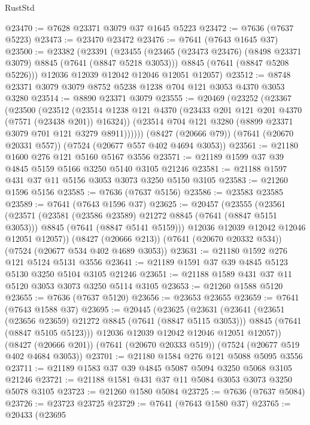 \begin{lexlean}{RustStd}
\begin{coremodule}
{\begin{coremodule}
{{{{{{{{{{{{{{{{{{{{{{{{{{{{{{{{@23470 := @7628 @23371 @3079 @37 @1645 @5223
@23472 := @7636 (@7637 @5223)
@23473 := @23470 @23472
@23476 := @7641 (@7643 @1645 @37)
@23500 := @23382
    (@23391
      (@23455
        (@23465 (@23473 @23476) (@8498 @23371 @3079) @8845 (@7641 (@8847 @5218 @3053)))
        @8845
        (@7641 (@8847 @5208 @5226)))
      @12036
      @12039
      @12042
      @12046
      @12051
      @12057)
@23512 := @8748 @23371 @3079 @3079 @8752 @5238 @1238 @704 @121 @3053 @4370 @3053 @3280
@23514 := @8890 @23371 @3079
@23555 := @20469
    (@23252
      (@23367
        (@23500
          (@23512
            (@23514 @1238 @121 @4370 (@23433 @201 @121 @201 @4370 (@7571 (@23438 @201)) @16324))
            (@23514 @704 @121 @3280 (@8899 @23371 @3079 @701 @121 @3279 @8911))))))
    (@8427 (@20666 @79))
    (@7641 (@20670 @20331 @557))
    (@7524 (@20677 @557 @402 @4694 @3053))
@23561 := @21180 @1600 @276 @121 @5160 @5167 @3556
@23571 := @21189 @1599 @37 @39 @4845 @5159 @5166 @3250 @5140 @3105 @21246
@23581 := @21188 @1597 @431 @37 @11 @5156 @3053 @3073 @3250 @5150 @3105
@23583 := @21260 @1596 @5156
@23585 := @7636 (@7637 @5156)
@23586 := @23583 @23585
@23589 := @7641 (@7643 @1596 @37)
@23625 := @20457
    (@23555
      (@23561
        (@23571
          (@23581 (@23586 @23589) @21272 @8845 (@7641 (@8847 @5151 @3053)))
          @8845
          (@7641 (@8847 @5141 @5159)))
        @12036
        @12039
        @12042
        @12046
        @12051
        @12057))
    (@8427 (@20666 @213))
    (@7641 (@20670 @20332 @534))
    (@7524 (@20677 @534 @402 @4689 @3053))
@23631 := @21180 @1592 @276 @121 @5124 @5131 @3556
@23641 := @21189 @1591 @37 @39 @4845 @5123 @5130 @3250 @5104 @3105 @21246
@23651 := @21188 @1589 @431 @37 @11 @5120 @3053 @3073 @3250 @5114 @3105
@23653 := @21260 @1588 @5120
@23655 := @7636 (@7637 @5120)
@23656 := @23653 @23655
@23659 := @7641 (@7643 @1588 @37)
@23695 := @20445
    (@23625
      (@23631
        (@23641
          (@23651 (@23656 @23659) @21272 @8845 (@7641 (@8847 @5115 @3053)))
          @8845
          (@7641 (@8847 @5105 @5123)))
        @12036
        @12039
        @12042
        @12046
        @12051
        @12057))
    (@8427 (@20666 @201))
    (@7641 (@20670 @20333 @519))
    (@7524 (@20677 @519 @402 @4684 @3053))
@23701 := @21180 @1584 @276 @121 @5088 @5095 @3556
@23711 := @21189 @1583 @37 @39 @4845 @5087 @5094 @3250 @5068 @3105 @21246
@23721 := @21188 @1581 @431 @37 @11 @5084 @3053 @3073 @3250 @5078 @3105
@23723 := @21260 @1580 @5084
@23725 := @7636 (@7637 @5084)
@23726 := @23723 @23725
@23729 := @7641 (@7643 @1580 @37)
@23765 := @20433
    (@23695
}}}}}}}}}}}}}}}}}}}}}}}}}}}}}}}}
\end{coremodule}}
\end{coremodule}
\end{lexlean}
